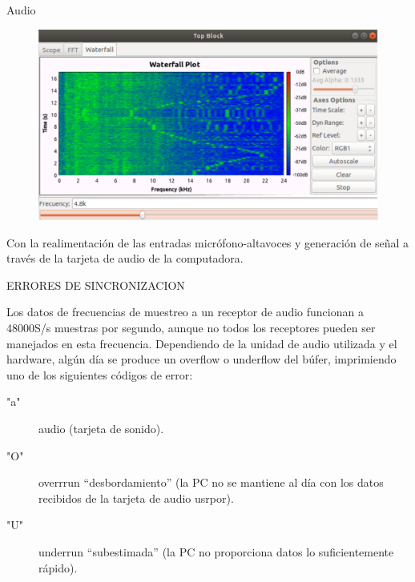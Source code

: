 \begin{frame}{Audio}

\begin{figure}
\begin{center}
\vspace{-8mm}
\includegraphics[width=\textwidth, height=0.6\paperheight]{parte1/lab4/pdf/lab4_10.pdf}
\end{center}
\end{figure}
\vspace{-5mm}
Con la realimentación de las entradas micrófono-altavoces y generación de señal a través de la tarjeta de audio de la computadora.

\end{frame}

\begin{frame}{ERRORES DE SINCRONIZACION}

Los datos de frecuencias de muestreo a un receptor de audio funcionan a 48000S/s muestras por segundo, aunque no todos los receptores pueden ser manejados en esta frecuencia. Dependiendo de la unidad de audio utilizada y el hardware, algún día se produce un overflow o underflow del búfer, imprimiendo uno de los siguientes códigos de error:\\ \vspace{2mm}


\begin{description}
   
\item["a"] audio (tarjeta de sonido).\\ \vspace{2mm}
\item["O"]overrrun “desbordamiento” (la PC no se mantiene al día con los datos recibidos de la tarjeta de audio usrpor). \\ \vspace{2mm}
\item["U"] underrun “subestimada” (la PC no proporciona datos lo suficientemente rápido).\\ \vspace{2mm}


\end{description}

\end{frame}

